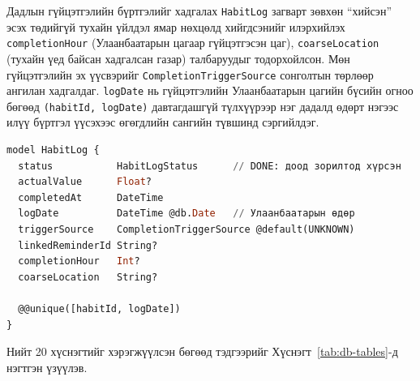 Дадлын гүйцэтгэлийн бүртгэлийг хадгалах \texttt{HabitLog} загварт зөвхөн ``хийсэн'' эсэх төдийгүй тухайн үйлдэл ямар нөхцөлд хийгдсэнийг илэрхийлэх \texttt{completionHour} (Улаанбаатарын цагаар гүйцэтгэсэн цаг), \texttt{coarseLocation} (тухайн үед байсан хадгалсан газар) талбаруудыг тодорхойлсон. Мөн гүйцэтгэлийн эх үүсвэрийг \texttt{CompletionTriggerSource} сонголтын төрлөөр ангилан хадгалдаг. \texttt{logDate} нь гүйцэтгэлийн Улаанбаатарын цагийн бүсийн огноо бөгөөд \texttt{(habitId, logDate)} давтагдашгүй түлхүүрээр нэг дадалд өдөрт нэгээс илүү бүртгэл үүсэхээс өгөгдлийн сангийн түвшинд сэргийлдэг.

\begin{lstlisting}[language=SQL, caption={Гүйцэтгэлийн бүртгэлийн загвар}]
model HabitLog {
  status           HabitLogStatus      // DONE: доод зорилтод хүрсэн
  actualValue      Float?
  completedAt      DateTime
  logDate          DateTime @db.Date   // Улаанбаатарын өдөр
  triggerSource    CompletionTriggerSource @default(UNKNOWN)
  linkedReminderId String?
  completionHour   Int?
  coarseLocation   String?

  @@unique([habitId, logDate])
}
\end{lstlisting}

Нийт 20 хүснэгтийг хэрэгжүүлсэн бөгөөд тэдгээрийг Хүснэгт~\ref{tab:db-tables}-д нэгтгэн үзүүлэв.

